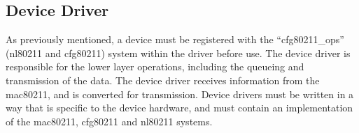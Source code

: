 \subsection{Device Driver}

As previously mentioned, a device must be registered with the ``cfg80211\_ops''
(nl80211 and cfg80211) system within the driver before use. The device driver is
responsible for the lower layer operations, including the queueing and transmission
of the
data\cite{chou_2015}. The device driver receives information from the mac80211,
and is converted for transmission. Device drivers must be written in a way that
is specific to the device hardware, and must contain an implementation of the
mac80211, cfg80211 and nl80211 systems.

